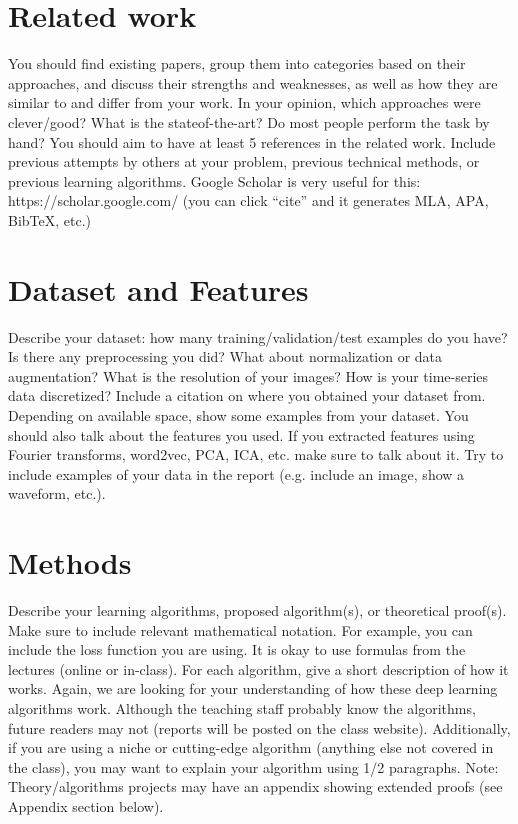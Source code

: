 \documentclass{article}
\begin{document}
\section{Related work}
You should find existing papers, group them into categories based on their approaches,
and discuss their strengths and weaknesses, as well as how they are similar to and differ
from your work. In your opinion, which approaches were clever/good? What is the stateof-the-art?
Do most people perform the task by hand? You should aim to have at least
5 references in the related work. Include previous attempts by others at your problem,
previous technical methods, or previous learning algorithms. Google Scholar is very useful
for this: https://scholar.google.com/ (you can click “cite” and it generates MLA, APA,
BibTeX, etc.)

\section{Dataset and Features}
Describe your dataset: how many training/validation/test examples do you have? Is there
any preprocessing you did? What about normalization or data augmentation? What is the
resolution of your images? How is your time-series data discretized? Include a citation on
where you obtained your dataset from. Depending on available space, show some examples
from your dataset. You should also talk about the features you used. If you extracted
features using Fourier transforms, word2vec, PCA,
ICA, etc. make sure to talk about it. Try to include examples of your data in the report
(e.g. include an image, show a waveform, etc.).



\section{ Methods }
Describe your learning algorithms, proposed algorithm(s), or theoretical proof(s). Make
sure to include relevant mathematical notation. For example, you can include the loss function you are using. It is okay to use formulas from the lectures (online or in-class). For each algorithm, give a short description 
of how it works. Again, we are looking for your understanding of how these deep
learning algorithms work. Although the teaching staff probably know the algorithms, future
readers may not (reports will be posted on the class website). Additionally, if you are
using a niche or cutting-edge algorithm (anything else not covered in the class), you may want to explain your algorithm using 1/2
paragraphs. Note: Theory/algorithms projects may have an appendix showing extended
proofs (see Appendix section below).
\end{document}
